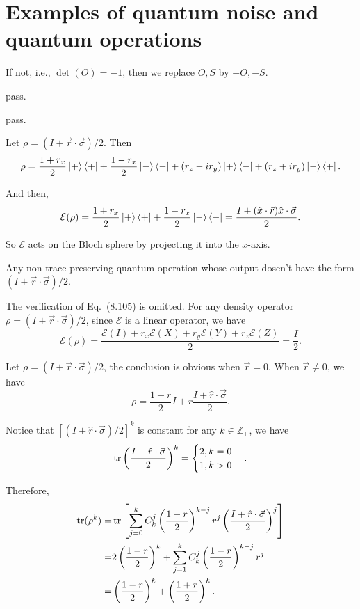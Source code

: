 \section{Examples of quantum noise and quantum operations}

\ex If not, i.e., $\det(O)=-1$, then we replace $O,S$ by $-O,-S$.

\ex pass.

\ex pass.

\ex Let $\rho=(I+\vec{r}\cdot\vec{\sigma})/2$.
Then $$\rho=\frac{1+r_x}{2}\left|+\right\rangle\left\langle+\right|+\frac{1-r_x}{2}\left|-\right\rangle\left\langle-\right|+(r_z-ir_y)\left|+\right\rangle\left\langle-\right|+(r_z+ir_y)\left|-\right\rangle\left\langle+\right|.$$

And then,
$$\mathcal{E}(\rho) = \frac{1+r_x}{2}\left|+\right\rangle\left\langle+\right|+\frac{1-r_x}{2}\left|-\right\rangle\left\langle-\right| = \frac{I+(\hat{x}\cdot\vec{r})\hat{x}\cdot\vec{\sigma}}{2}.$$

So $\mathcal{E}$ acts on the Bloch sphere by projecting it into the $x$-axis.

\ex Any non-trace-preserving quantum operation whose output dosen't have the form $(I+\vec{r}\cdot\vec{\sigma})/2$.

\ex The verification of Eq.~(8.105) is omitted.
For any density operator $\rho=(I+\vec{r}\cdot\vec{\sigma})/2$, since $\mathcal{E}$ is a linear operator, we have
$$\mathcal{E}(\rho) = \frac{\mathcal{E}(I) + r_x\mathcal{E}(X) + r_y\mathcal{E}(Y) + r_z\mathcal{E}(Z)}{2} = \frac{I}{2}.$$

\ex Let $\rho=(I+\vec{r}\cdot\vec{\sigma})/2$, the conclusion is obvious when $\vec{r}=0$.
When $\vec{r}\neq 0$, we have
$$\rho=\frac{1-r}{2}I+r\frac{I+\hat{r}\cdot\vec{\sigma}}{2}.$$

Notice that $[(I+\hat{r}\cdot\vec{\sigma})/2]^k$ is constant for any $k\in\mathbb{Z}_+$, we have
$$\operatorname{tr}\left(\frac{I+\hat{r}\cdot\vec{\sigma}}{2}\right)^k=\begin{cases}2,k=0\\1,k>0\end{cases}.$$

Therefore,
$$\begin{aligned}
    \operatorname{tr}(\rho^k) = & \operatorname{tr}\left[ \sum_{j=0}^k C_k^j \left(\frac{1-r}{2}\right)^{k-j} r^j \left(\frac{I+\hat{r}\cdot\vec{\sigma}}{2}\right)^j \right]
    \\ = & 2\left(\frac{1-r}{2}\right)^k + \sum_{j=1}^k C_k^j \left(\frac{1-r}{2}\right)^{k-j} r^j
    \\ = & \left(\frac{1-r}{2}\right)^k + \left(\frac{1+r}{2}\right)^k.
\end{aligned}$$

